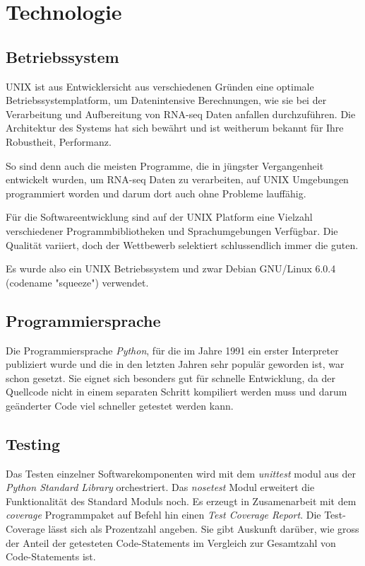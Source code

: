 \documentclass[a4paper]{thesis}
\begin{document}
\section{Technologie}

\subsection{Betriebssystem}

UNIX ist aus Entwicklersicht aus verschiedenen Gründen eine optimale
Betriebssystemplatform, um Datenintensive Berechnungen, wie sie bei
der Verarbeitung und Aufbereitung von RNA-seq Daten anfallen durchzuführen.
Die Architektur des Systems hat sich bewährt und ist weitherum bekannt
für Ihre Robustheit, Performanz.

So sind denn auch die meisten Programme, die in jüngster Vergangenheit
entwickelt wurden, um RNA-seq Daten zu verarbeiten, auf UNIX Umgebungen
programmiert worden und darum dort auch ohne Probleme lauffähig.

Für die Softwareentwicklung sind auf der UNIX Platform
eine Vielzahl verschiedener Programmbibliotheken und Sprachumgebungen
Verfügbar. Die Qualität variiert, doch der Wettbewerb selektiert
schlussendlich immer die guten.

Es wurde also ein UNIX Betriebssystem und zwar Debian GNU/Linux 6.0.4
(codename "squeeze") verwendet.

\subsection{Programmiersprache}

Die Programmiersprache {\em Python}, für die im Jahre 1991 ein erster
Interpreter publiziert wurde und die in den letzten Jahren sehr
populär geworden ist, war schon gesetzt. Sie eignet sich besonders gut
für schnelle Entwicklung, da der
Quellcode nicht in einem separaten Schritt kompiliert werden muss und
darum geänderter Code viel schneller getestet werden kann.

\subsection{Testing}

Das Testen einzelner Softwarekomponenten wird mit dem {\em unittest} modul
aus der {\em Python Standard Library} orchestriert. Das {\em nosetest}
Modul erweitert die Funktionalität des Standard Moduls noch.
Es erzeugt in Zusamenarbeit mit dem {\em coverage}
Programmpaket auf Befehl hin einen {\em Test Coverage Report}. Die
Test-Coverage lässt sich als Prozentzahl angeben. Sie gibt Auskunft darüber,
wie gross der Anteil der getesteten Code-Statements im Vergleich zur Gesamtzahl
von Code-Statements ist.
\end{document}

